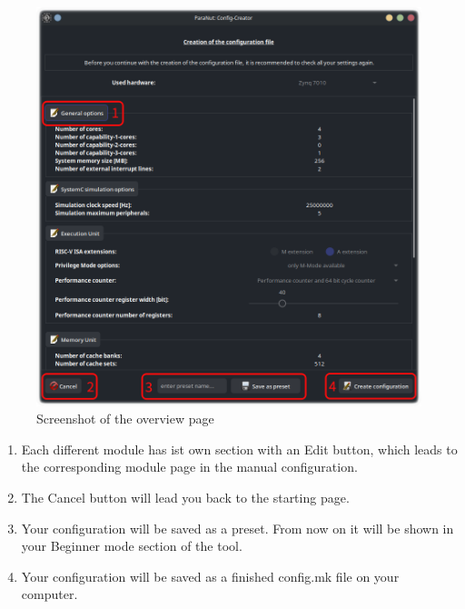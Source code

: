 \begin{figure}[!h]
    \noindent \begin{centering}
        \includegraphics[width=15cm]{images/final_page}
        \par\end{centering}
    \caption{Screenshot of the overview page}
\end{figure}

\begin{enumerate}
	\item Each different module has ist own section with an \glqq Edit\grqq{}  button, which leads to the corresponding module page in the manual configuration.
	\item The \glqq Cancel\grqq{}  button will lead you back to the starting page.
	\item Your configuration will be saved as a preset. From now on it will be shown in your Beginner mode section of the tool.
	\item Your configuration will be saved as a finished config.mk file on your computer.

\end{enumerate}


